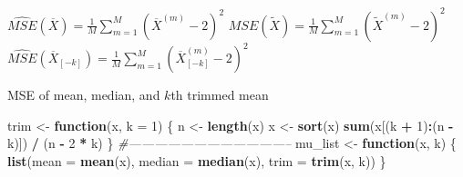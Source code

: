 \documentclass[]{book}
\newenvironment{Shaded}{\begin{snugshade}}{\end{snugshade}}
\newcommand{\CommentTok}[1]{\textcolor[rgb]{0.56,0.35,0.01}{\textit{#1}}}
\newcommand{\ControlFlowTok}[1]{\textcolor[rgb]{0.13,0.29,0.53}{\textbf{#1}}}
\newcommand{\DataTypeTok}[1]{\textcolor[rgb]{0.13,0.29,0.53}{#1}}
\newcommand{\DecValTok}[1]{\textcolor[rgb]{0.00,0.00,0.81}{#1}}
\newcommand{\KeywordTok}[1]{\textcolor[rgb]{0.13,0.29,0.53}{\textbf{#1}}}
\newcommand{\NormalTok}[1]{#1}
\newcommand{\OperatorTok}[1]{\textcolor[rgb]{0.81,0.36,0.00}{\textbf{#1}}}
\newcommand{\StringTok}[1]{\textcolor[rgb]{0.31,0.60,0.02}{#1}}
\theoremstyle{definition}
\theoremstyle{definition}
\theoremstyle{definition}
\theoremstyle{remark}
\begin{document}
\begin{algorithm}[H] \label{alg:algmse}
  \SetAlgoLined
  $\widehat{MSE}(\overline{X}) = \frac{1}{M} \sum\limits_{m = 1}^M (\overline{X}^{(m)} - 2)^2$\;
  $\widehat{MSE}(\tilde{X}) = \frac{1}{M} \sum\limits_{m = 1}^M (\tilde{X}^{(m)} - 2)^2$\;
  $\widehat{MSE}(\overline{X}_{[-k]}) = \frac{1}{M} \sum\limits_{m = 1}^M (\overline{X}_{[-k]}^{(m)} - 2)^2$\;
  \caption{MSE of mean, median, and $k$th trimmed mean}
\end{algorithm}

\begin{Shaded}
\begin{Highlighting}[]
\NormalTok{trim <-}\StringTok{ }\ControlFlowTok{function}\NormalTok{(x, }\DataTypeTok{k =} \DecValTok{1}\NormalTok{) \{}
\NormalTok{  n <-}\StringTok{ }\KeywordTok{length}\NormalTok{(x)}
\NormalTok{  x <-}\StringTok{ }\KeywordTok{sort}\NormalTok{(x)}
  \KeywordTok{sum}\NormalTok{(x[(k }\OperatorTok{+}\StringTok{ }\DecValTok{1}\NormalTok{)}\OperatorTok{:}\NormalTok{(n }\OperatorTok{-}\StringTok{ }\NormalTok{k)]) }\OperatorTok{/}\StringTok{ }\NormalTok{(n }\OperatorTok{-}\StringTok{ }\DecValTok{2} \OperatorTok{*}\StringTok{ }\NormalTok{k)}
\NormalTok{\}}
\CommentTok{#--------------------------------------}
\NormalTok{mu_list <-}\StringTok{ }\ControlFlowTok{function}\NormalTok{(x, k) \{}
  \KeywordTok{list}\NormalTok{(}\DataTypeTok{mean =} \KeywordTok{mean}\NormalTok{(x), }\DataTypeTok{median =} \KeywordTok{median}\NormalTok{(x), }\DataTypeTok{trim =} \KeywordTok{trim}\NormalTok{(x, k))}
\NormalTok{\}}
\end{Highlighting}
\end{Shaded}
\end{document}
